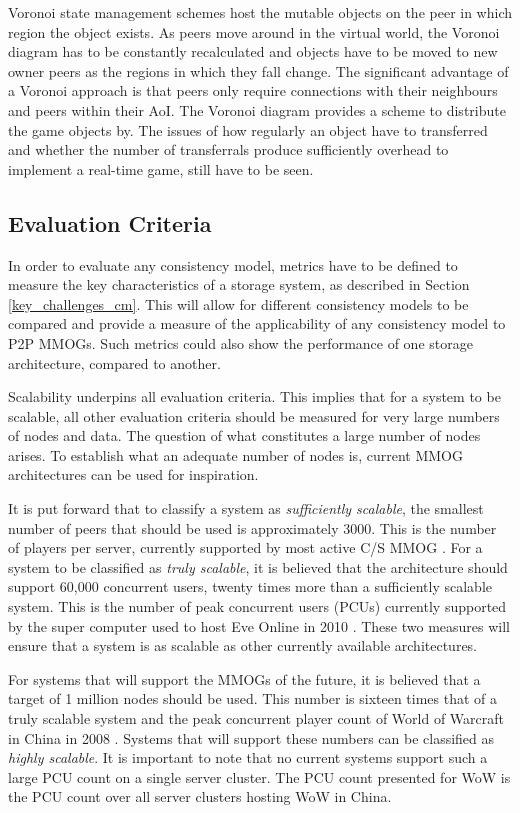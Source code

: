 \documentclass[10pt,a4paper,journal,cspaper,compsoc]{IEEEtran}
\begin{document}
Voronoi state management schemes host the mutable objects on the peer in which region the object exists. As peers move around in the virtual world,
the Voronoi diagram has to be constantly recalculated and objects have to be moved to new owner peers as the regions in which they fall change. The
significant advantage of a Voronoi approach is that peers only require connections with their neighbours and peers within their AoI. The Voronoi
diagram provides a scheme to distribute the game objects by. The issues of how regularly an object have to transferred and whether the number of
transferrals produce sufficiently overhead to implement a real-time game, still have to be seen.


\subsection{Evaluation Criteria} \label{eval_crit}

In order to evaluate any consistency model, metrics have to be defined to measure the key characteristics of a storage system, as described in
Section \ref{key_challenges_cm}. This will allow for different consistency models to be compared and provide a measure of the applicability of any
consistency model to P2P MMOGs. Such metrics could also show the performance of one storage architecture, compared to another.

Scalability underpins all evaluation criteria. This implies that for a system to be scalable, all other evaluation criteria should be measured for
very large numbers of nodes and data. The question of what constitutes a large number of nodes arises. To establish what an adequate number of nodes
is, current MMOG architectures can be used for inspiration.

It is put forward that to classify a system as \emph{sufficiently scalable}, the smallest number of peers that should be used is approximately 3000.
This is the number of players per server, currently supported by most active C/S MMOG \cite{}. For a system to be classified as \emph{truly
scalable}, it is believed that the architecture should support 60,000 concurrent users, twenty times more than a sufficiently scalable system. This
is the number of peak concurrent users (PCUs) currently supported by the super computer used to host Eve Online in 2010 \cite{eve_pcu}. These two
measures will ensure that a system is as scalable as other currently available architectures.

For systems that will support the MMOGs of the future, it is believed that a target of 1 million nodes should be used. This number is sixteen times
that of a truly scalable system and the peak concurrent player count of World of Warcraft in China in 2008 \cite{WoW_china_pcu}. Systems that will
support these numbers can be classified as \emph{highly scalable}. It is important to note that no current systems support such a large PCU count on
a single server cluster. The PCU count presented for WoW is the PCU count over all server clusters hosting WoW in China.
\end{document}
